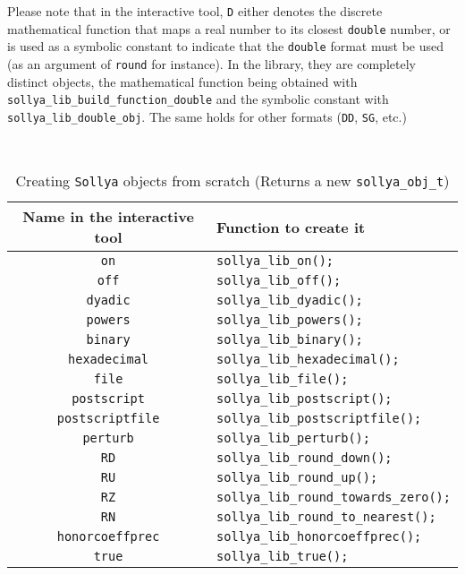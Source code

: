 \documentclass[a4paper]{article}
\newcommand{\sollya}{\texttt{Sollya}\xspace}
\begin{document}
Please note that in the interactive tool, \texttt{D} either denotes the discrete mathematical function that maps a real number to its closest \texttt{double} number, or is used as a symbolic constant to indicate that the \texttt{double} format must be used (as an argument of \texttt{round} for instance). In the library, they are completely distinct objects, the mathematical function being obtained with \texttt{sollya\_lib\_build\_function\_double} and the symbolic constant with \texttt{sollya\_lib\_double\_obj}. The same holds for other formats (\texttt{DD}, \texttt{SG}, etc.)
\begin{table}[htp]
  \caption{Creating \sollya objects from scratch (Returns a new \texttt{sollya\_obj\_t})}
  \label{creating_sollya_obj_t}
  \renewcommand{\footnoterule}{} %
  \begin{minipage}{\textwidth}
    ~
    \begin{center}
      \begin{tabular}{|c|l|}
    \hline
    Name in the interactive tool & \hfil \phantom{\Large{$A^A$}}Function to create it\phantom{\Large{$A^A$}}\hfil \\ \hline
\verb|on| & \verb|sollya_lib_on();| \\
\verb|off| & \verb|sollya_lib_off();| \\
\verb|dyadic| & \verb|sollya_lib_dyadic();| \\
\verb|powers| & \verb|sollya_lib_powers();| \\
\verb|binary| & \verb|sollya_lib_binary();| \\
\verb|hexadecimal| & \verb|sollya_lib_hexadecimal();| \\
\verb|file| & \verb|sollya_lib_file();| \\
\verb|postscript| & \verb|sollya_lib_postscript();| \\
\verb|postscriptfile| & \verb|sollya_lib_postscriptfile();| \\
\verb|perturb| & \verb|sollya_lib_perturb();| \\
\verb|RD| & \verb|sollya_lib_round_down();| \\
\verb|RU| & \verb|sollya_lib_round_up();| \\
\verb|RZ| & \verb|sollya_lib_round_towards_zero();| \\
\verb|RN| & \verb|sollya_lib_round_to_nearest();| \\
\verb|honorcoeffprec| & \verb|sollya_lib_honorcoeffprec();| \\
\verb|true| & \verb|sollya_lib_true();| \\

\end{tabular}
\end{center}
\end{minipage}
\end{table}
\end{document}
